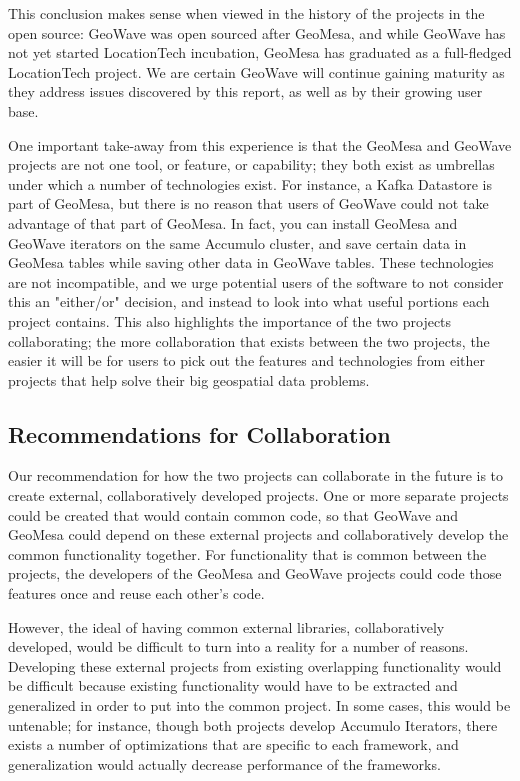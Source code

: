 This conclusion makes sense when viewed in the history of the projects in the open source: GeoWave was open sourced after GeoMesa, and while GeoWave has not yet started LocationTech incubation, GeoMesa has graduated as a full-fledged LocationTech project.
We are certain GeoWave will continue gaining maturity as they address issues discovered by this report, as well as by their growing user base.

One important take-away from this experience is that the GeoMesa and GeoWave projects are not one tool, or feature, or capability; they both exist as umbrellas under which a number of technologies exist.
For instance, a Kafka Datastore is part of GeoMesa, but there is no reason that users of GeoWave could not take advantage of that part of GeoMesa.
In fact, you can install GeoMesa and GeoWave iterators on the same Accumulo cluster, and save certain data in GeoMesa tables while saving other data in GeoWave tables.
These technologies are not incompatible, and we urge potential users of the software to not consider this an "either/or" decision, and instead to look into what useful portions each project contains.
This also highlights the importance of the two projects collaborating; the more collaboration that exists between the two projects, the easier it will be for users to pick out the features and technologies from either projects that help solve their big geospatial data problems.


\subsection{Recommendations for Collaboration}
\label{sec:conclusions:collaboration}

Our recommendation for how the two projects can collaborate in the future is to create external, collaboratively developed projects.
One or more separate projects could be created that would contain common code, so that GeoWave and GeoMesa could depend on these external projects and collaboratively develop the common functionality together.
For functionality that is common between the projects, the developers of the GeoMesa and GeoWave projects could code those features once and reuse each other's code.

However, the ideal of having common external libraries, collaboratively developed, would be difficult to turn into a reality for a number of reasons.
Developing these external projects from existing overlapping functionality would be difficult because existing functionality would have to be extracted and generalized in order to put into the common project.
In some cases, this would be untenable; for instance, though both projects develop Accumulo Iterators, there exists a number of optimizations that are specific to each framework, and generalization would actually decrease performance of the frameworks.

